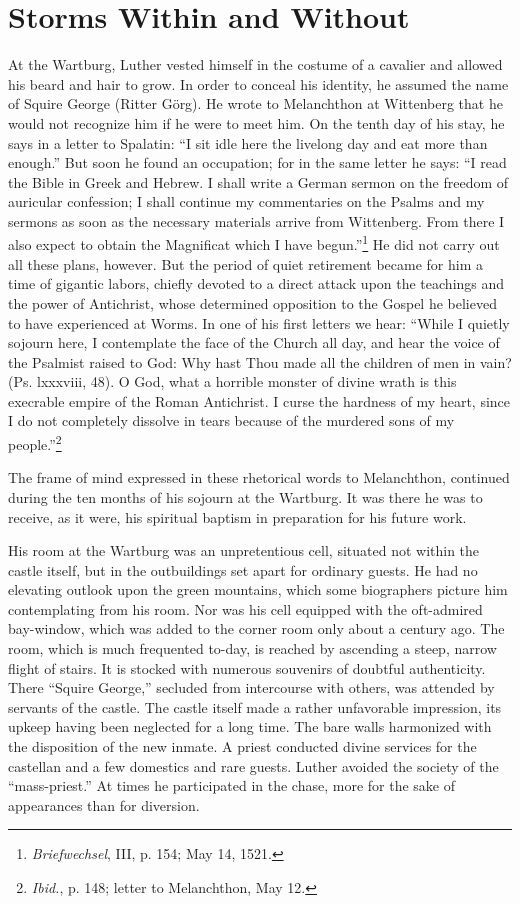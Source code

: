 
\section{Storms Within and Without}

At the Wartburg, Luther vested himself in the costume of a
cavalier and allowed his beard and hair to grow. In order to conceal
his identity, he assumed the name of Squire George (Ritter Görg).
He wrote to Melanchthon at Wittenberg that he would not recognize
him if he were to meet him. On the tenth day of his stay, he says
in a letter to Spalatin: “I sit idle here the livelong day and eat more
than enough.” But soon he found an occupation; for in the same
letter he says: “I read the Bible in Greek and Hebrew. I shall write
a German sermon on the freedom of auricular confession; I shall
continue my commentaries on the Psalms and my sermons as soon
as the necessary materials arrive from Wittenberg. From there I also
expect to obtain the Magnificat which I have begun.”\footnote{\textit{Briefwechsel}, III, p. 154; May 14, 1521.}
He did
not carry out all these plans, however. But the period of quiet retirement
became for him a time of gigantic labors, chiefly devoted to
a direct attack upon the teachings and the power of Antichrist,
whose determined opposition to the Gospel he believed to have experienced
at Worms. In one of his first letters we hear: “While I
quietly sojourn here, I contemplate the face of the Church all day,
and hear the voice of the Psalmist raised to God: Why hast Thou
made all the children of men in vain? (Ps. lxxxviii, 48). O God,
what a horrible monster of divine wrath is this execrable empire of
the Roman Antichrist. I curse the hardness of my heart, since I
do not completely dissolve in tears because of the murdered sons of
my people.”\footnote{\textit{Ibid.}, p. 148; letter to Melanchthon, May 12.}

The frame of mind expressed in these rhetorical words to Melanchthon,
continued during the ten months of his sojourn at the
Wartburg. It was there he was to receive, as it were, his spiritual
baptism in preparation for his future work.

His room at the Wartburg was an unpretentious cell, situated not
within the castle itself, but in the outbuildings set apart for ordinary
guests. He had no elevating outlook upon the green mountains,
which some biographers picture him contemplating from his room.
Nor was his cell equipped with the oft-admired bay-window, which
was added to the corner room only about a century ago. The room,
which is much frequented to-day, is reached by ascending a steep,
narrow flight of stairs. It is stocked with numerous souvenirs of
doubtful authenticity. There “Squire George,” secluded from intercourse
with others, was attended by servants of the castle. The castle
itself made a rather unfavorable impression, its upkeep having
been neglected for a long time. The bare walls harmonized with the
disposition of the new inmate. A priest conducted divine services for
the castellan and a few domestics and rare guests. Luther avoided the
society of the “mass-priest.” At times he participated in the chase,
more for the sake of appearances than for diversion.

